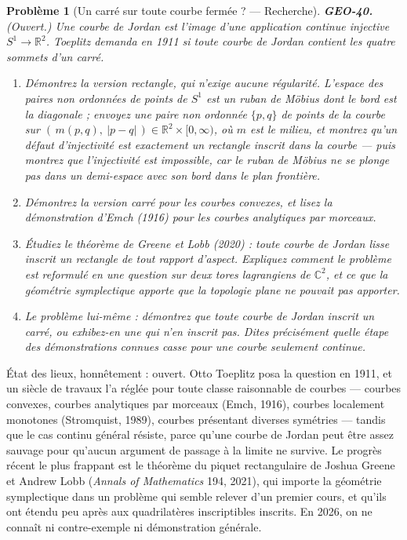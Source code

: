 \documentclass[11pt]{article}
\newtheorem{problem}{Problème}
\begin{document}
\bigskip

\begin{problem}[{Un carré sur toute courbe fermée ? --- Recherche}]
\textbf{GEO-40.} (Ouvert.) Une \textit{courbe de Jordan} est l'image d'une application continue
injective $ S^1 \to \mathbb{R}^2 $. Toeplitz demanda en 1911 si toute courbe de Jordan contient
les quatre sommets d'un carré.
\begin{enumerate}
\item[(a)] Démontrez la version rectangle, qui n'exige aucune régularité. L'espace des paires non
ordonnées de points de $ S^1 $ est un ruban de Möbius dont le bord est la diagonale ; envoyez une
paire non ordonnée $ \{p, q\} $ de points de la courbe sur
$ (\,m(p,q), \ |p - q|\,) \in \mathbb{R}^2 \times [0,\infty) $, où $ m $ est le milieu, et
montrez qu'un défaut d'injectivité est exactement un rectangle inscrit dans la courbe --- puis
montrez que l'injectivité est impossible, car le ruban de Möbius ne se plonge pas dans un
demi-espace avec son bord dans le plan frontière.
\item[(b)] Démontrez la version carré pour les courbes convexes, et lisez la démonstration d'Emch (1916)
pour les courbes analytiques par morceaux.
\item[(c)] Étudiez le théorème de Greene et Lobb (2020) : toute courbe de Jordan lisse inscrit un
rectangle de \textit{tout} rapport d'aspect. Expliquez comment le problème est reformulé en une
question sur deux tores lagrangiens de $ \mathbb{C}^2 $, et ce que la géométrie symplectique
apporte que la topologie plane ne pouvait pas apporter.
\item[(d)] Le problème lui-même : démontrez que toute courbe de Jordan inscrit un carré, ou exhibez-en une
qui n'en inscrit pas. Dites précisément quelle étape des démonstrations connues casse pour une
courbe seulement continue.
\end{enumerate}

\end{problem}

\noindent État des lieux, honnêtement : ouvert. Otto Toeplitz posa la question en 1911, et
un siècle de travaux l'a réglée pour toute classe raisonnable de courbes --- courbes convexes,
courbes analytiques par morceaux (Emch, 1916), courbes localement monotones (Stromquist, 1989),
courbes présentant diverses symétries --- tandis que le cas continu général résiste, parce qu'une
courbe de Jordan peut être assez sauvage pour qu'aucun argument de passage à la limite ne survive.
Le progrès récent le plus frappant est le théorème du piquet rectangulaire de Joshua Greene et
Andrew Lobb (\textit{Annals of Mathematics} 194, 2021), qui importe la géométrie symplectique dans un
problème qui semble relever d'un premier cours, et qu'ils ont étendu peu après aux quadrilatères
inscriptibles inscrits. En 2026, on ne connaît ni contre-exemple ni démonstration générale.
\end{document}
